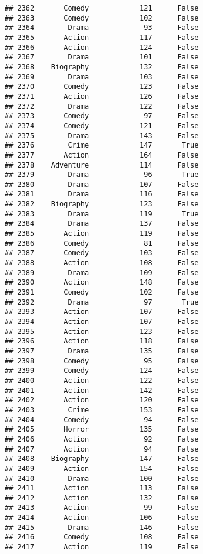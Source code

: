 \documentclass[
]{article}
\begin{document}
\begin{verbatim}
## 2362       Comedy            121      False
## 2363       Comedy            102      False
## 2364        Drama             93      False
## 2365       Action            117      False
## 2366       Action            124      False
## 2367        Drama            101      False
## 2368    Biography            132      False
## 2369        Drama            103      False
## 2370       Comedy            123      False
## 2371       Action            126      False
## 2372        Drama            122      False
## 2373       Comedy             97      False
## 2374       Comedy            121      False
## 2375        Drama            143      False
## 2376        Crime            147       True
## 2377       Action            164      False
## 2378    Adventure            114      False
## 2379        Drama             96       True
## 2380        Drama            107      False
## 2381        Drama            116      False
## 2382    Biography            123      False
## 2383        Drama            119       True
## 2384        Drama            137      False
## 2385       Action            119      False
## 2386       Comedy             81      False
## 2387       Comedy            103      False
## 2388       Action            108      False
## 2389        Drama            109      False
## 2390       Action            148      False
## 2391       Comedy            102      False
## 2392        Drama             97       True
## 2393       Action            107      False
## 2394       Action            107      False
## 2395       Action            123      False
## 2396       Action            118      False
## 2397        Drama            135      False
## 2398       Comedy             95      False
## 2399       Comedy            124      False
## 2400       Action            122      False
## 2401       Action            142      False
## 2402       Action            120      False
## 2403        Crime            153      False
## 2404       Comedy             94      False
## 2405       Horror            135      False
## 2406       Action             92      False
## 2407       Action             94      False
## 2408    Biography            147      False
## 2409       Action            154      False
## 2410        Drama            100      False
## 2411       Action            113      False
## 2412       Action            132      False
## 2413       Action             99      False
## 2414       Action            106      False
## 2415        Drama            146      False
## 2416       Comedy            108      False
## 2417       Action            119      False

\end{verbatim}
\end{document}
